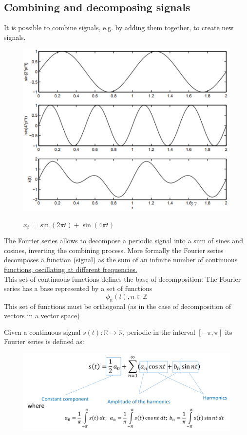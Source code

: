 \subsection{Combining and decomposing signals}
It is possible to combine signals, e.g. by adding them together, to create new signals.
\begin{figure}[htbp]
   \centering
   \includegraphics{images/signals_combination.png}
   \label{fig:signals_combination}

   $x_t = \sin(2\pi t) + \sin(4\pi t)$
\end{figure}

The Fourier series allows to decompose a periodic signal into a sum of sines and cosines, inverting the combining process.
More formally the Fourier series\ul{ decomposes a function (signal) as the sum of an infinite number of continuous functions, oscillating at
different frequencies.}\\
This set of continuous functions defines the base of
decomposition.
The Fourier series has a base represented by a set of functions
\[
   \phi_n(t) , n \in \mathbb{Z}
\]
This set of functions must be orthogonal (as in the case of decomposition of vectors in a vector space)

\begin{definition}
   Given a continuous signal $s(t) : \mathbb{R} \rightarrow \mathbb{R}$, periodic in the interval $[-\pi, \pi]$ its Fourier
   series is defined as:
   \begin{figure}[htbp]
      \centering
      \includegraphics{images/fourierseries.png}
      \label{fig:fourierseries}
   \end{figure}
\end{definition}

